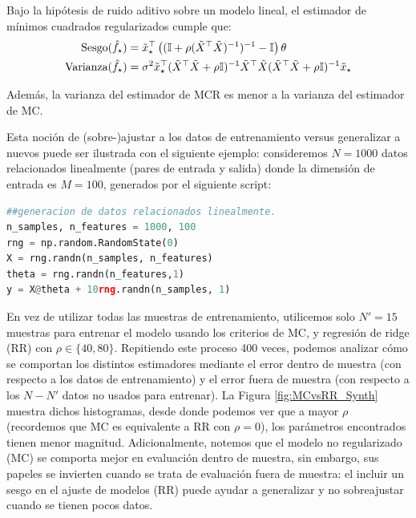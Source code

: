\begin{theorem} Bajo la hipótesis de ruido aditivo sobre un modelo lineal, el estimador de mínimos cuadrados regularizados cumple que:
	\begin{align}
	\text{Sesgo}(\hat f_\star) & = \tilde{x}_\star^\top \left(({\mathbb I}+\rho(\tilde{X}^\top\tilde{X})^{-1})^{-1}-{\mathbb I}\right)\theta\\
	\text{Varianza}(\hat f_\star) &= \sigma^2 \tilde{x}_\star^\top (\tilde{X}^\top\tilde{X} + \rho{\mathbb I})^{-1}\tilde{X}^\top\tilde{X}(\tilde{X}^\top\tilde{X}+\rho{\mathbb I})^{-1}	\tilde{x}_\star
\end{align}

Además, la varianza del estimador de MCR es menor a la varianza del estimador de MC.
\end{theorem}

Esta noción de (sobre-)ajustar a los datos de entrenamiento versus generalizar a  nuevos  puede ser ilustrada con el siguiente ejemplo: consideremos $N=1000$ datos relacionados linealmente (pares de entrada y salida) donde la dimensión de entrada es $M=100$, generados por el siguiente script:

\begin{lstlisting}[language=Python]
##generacion de datos relacionados linealmente.
n_samples, n_features = 1000, 100
rng = np.random.RandomState(0)
X = rng.randn(n_samples, n_features)
theta = rng.randn(n_features,1)
y = X@theta + 10rng.randn(n_samples, 1)
\end{lstlisting}

 En vez de utilizar todas las muestras de entrenamiento, utilicemos solo $N'=15$ muestras para entrenar el modelo usando los criterios de MC, y regresión de ridge (RR) con $\rho\in\{40,80\}$. Repitiendo este proceso 400 veces, podemos analizar cómo se comportan los distintos estimadores mediante el error dentro de muestra (con respecto a los datos de entrenamiento) y el error fuera de muestra (con respecto a los $N-N'$ datos no usados para entrenar). La Figura \ref{fig:MCvsRR_Synth} muestra dichos histogramas, desde donde podemos ver que a mayor $\rho$ (recordemos que MC es equivalente a RR con $\rho=0$), los parámetros encontrados tienen menor magnitud. Adicionalmente, notemos que el modelo no regularizado (MC) se comporta mejor en evaluación dentro de muestra, sin embargo, sus papeles se invierten cuando se trata de evaluación fuera de muestra: el incluir un sesgo en el ajuste de modelos (RR) puede ayudar a generalizar y no sobreajustar cuando se tienen pocos datos. 

